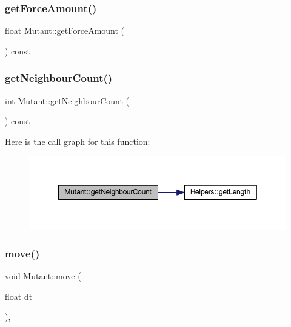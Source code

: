 \mbox{\label{class_mutant_a308e103233480f0f7cd626cffc90d833}} 
\subsubsection{\texorpdfstring{get\+Force\+Amount()}{getForceAmount()}}
{\footnotesize\ttfamily float Mutant\+::get\+Force\+Amount (\begin{DoxyParamCaption}{ }\end{DoxyParamCaption}) const}

\mbox{\label{class_mutant_aeca389c4c77ef86f9a41dd9e431abe50}} 
\subsubsection{\texorpdfstring{get\+Neighbour\+Count()}{getNeighbourCount()}}
{\footnotesize\ttfamily int Mutant\+::get\+Neighbour\+Count (\begin{DoxyParamCaption}{ }\end{DoxyParamCaption}) const}

Here is the call graph for this function\+:
\nopagebreak
\begin{figure}[H]
\begin{center}
\leavevmode
\includegraphics[width=349pt]{class_mutant_aeca389c4c77ef86f9a41dd9e431abe50_cgraph}
\end{center}
\end{figure}
\mbox{\label{class_mutant_a5f5208a68bebe2cd3773f771a18e2992}} 
\subsubsection{\texorpdfstring{move()}{move()}}
{\footnotesize\ttfamily void Mutant\+::move (\begin{DoxyParamCaption}\item[{float}]{dt }\end{DoxyParamCaption})\hspace{0.3cm}{\ttfamily [override]}, {\ttfamily [virtual]}}



